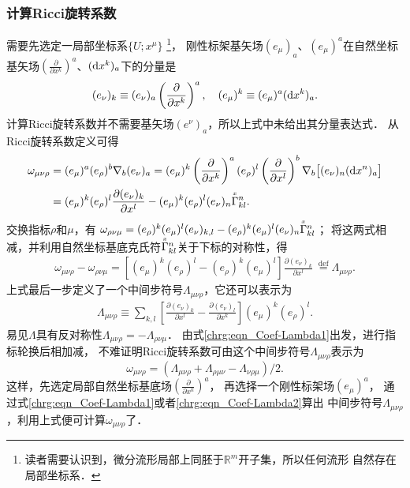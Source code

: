 \subsubsection{计算Ricci旋转系数}
     需要先选定一局部坐标系$\{U;x^\mu\}$
    {\footnote{读者需要认识到，微分流形局部上同胚于$\mathbb{R}^m$开子集，所以任何流形
            自然存在局部坐标系．}}，
刚性标架基矢场$(e_\mu)_{a}$、$(e_\mu)^{a}$在自然坐标
基矢场$(\frac{\partial}{\partial x^k})^{a}$、$({\rm d}x^k)_{a}$下的分量是
\begin{equation}\label{chrg:eqn_component-base}
(e_\nu)_{k} \equiv (e_\nu)_{a} \left(\frac{\partial}{\partial x^k}\right)^{a} , \quad
(e_\mu)^{k} \equiv (e_\mu)^{a} ({\rm d}x^k)_{a}.
\end{equation}
计算Ricci旋转系数并不需要基矢场$(e^\nu)_{a}$，所以上式中未给出其分量表达式．
从Ricci旋转系数定义可得
\begin{align*}
  \omega_{\mu\nu\rho} &= (e_\mu)^a  (e_\rho)^b \nabla _b (e_\nu)_a
  = (e_\mu)^{k} \left(\frac{\partial}{\partial x^k}\right)^{a}
   (e_\rho)^{l} \left(\frac{\partial}{\partial x^l}\right)^{b}
    \nabla _b \bigl[ (e_\nu)_{n}({\rm d}x^n)_{a} \bigr]  \\
  &=(e_\mu)^{k}(e_\rho)^{l} \frac{\partial (e_\nu)_{k}}{\partial x^l}
   -(e_\mu)^{k}(e_\rho)^{l} (e_\nu)_{n} \oversetmy{x}{\Gamma}^n _{kl} .
\end{align*}
交换指标$\rho$和$\mu$，有
$ \omega_{\rho\nu\mu} =(e_\rho)^{k}(e_\mu)^{l} (e_\nu)_{k,l}
-(e_\rho)^{k}(e_\mu)^{l} (e_\nu)_{n} \oversetmy{x}{\Gamma}^n _{kl}$；
将这两式相减，并利用自然坐标基底克氏符$\oversetmy{x}{\Gamma}^n _{kl}$关于下标的对称性，得
\begin{align}
  \omega_{\mu\nu\rho}  -  \omega_{\rho\nu\mu}=
  \left[ (e_\mu)^{k}(e_\rho)^{l}
     - (e_\rho)^{k}(e_\mu)^{l}  \right]
     \frac{\partial (e_\nu)_{k}}{\partial x^l}
  \ \overset{\mathrm {def}}{=} \Lambda_{\mu\nu\rho}. \label{chrg:eqn_Coef-Lambda1}
\end{align}
上式最后一步定义了一个中间步符号$\Lambda_{\mu\nu\rho}$，它还可以表示为
\begin{align}
    \Lambda_{\mu\nu\rho} \equiv \sum_{k,l }
    \left[ \frac{\partial (e_\nu)_{k}}{\partial x^l} -\frac{\partial (e_\nu)_{l}}{\partial x^k} \right]
    (e_\mu)^{k} (e_\rho)^{l} .  \label{chrg:eqn_Coef-Lambda2}
\end{align}
易见$\Lambda$具有反对称性$\Lambda_{\mu\nu\rho}=-\Lambda_{\rho\nu\mu}$．
由式\eqref{chrg:eqn_Coef-Lambda1}出发，进行指标轮换后相加减，
不难证明Ricci旋转系数可由这个中间步符号$\Lambda_{\mu\nu\rho}$表示为
\begin{equation}\label{chrg:eqn_Ricci-Coef}
\omega_{\mu\nu\rho} = \left(\Lambda_{\mu\nu\rho}
+ \Lambda_{\rho\mu\nu} - \Lambda_{\nu\rho\mu} \right) /2.
\end{equation}
这样，先选定局部自然坐标基底场$(\frac{\partial}{\partial x^k})^{a}$，
再选择一个刚性标架场$(e_\mu)^a$，
通过式\eqref{chrg:eqn_Coef-Lambda1}或者\eqref{chrg:eqn_Coef-Lambda2}算出
中间步符号$\Lambda_{\mu\nu\rho}$，利用上式便可计算$\omega_{\mu\nu\rho}$了．

